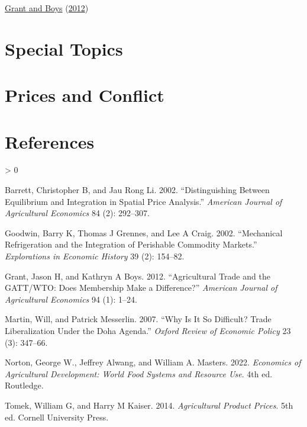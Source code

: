 \documentclass[
  oneside]{book}
\newlength{\cslhangindent}
\newenvironment{CSLReferences}[2] %
 {%
  \setlength{\parindent}{0pt}
  \ifodd #1 \everypar{\setlength{\hangindent}{\cslhangindent}}\ignorespaces\fi
  \ifnum #2 > 0
  \setlength{\parskip}{#2\baselineskip}
  \fi
 }%
 {}
\begin{document}
\protect\hyperlink{ref-grant2012}{Grant and Boys} (\protect\hyperlink{ref-grant2012}{2012})

\hypertarget{special-topics}{%
\chapter*{Special Topics}\label{special-topics}}

\hypertarget{prices-and-conflict}{%
\chapter{Prices and Conflict}\label{prices-and-conflict}}

\hypertarget{references}{%
\chapter*{References}\label{references}}

\hypertarget{refs}{}
\begin{CSLReferences}{1}{0}
\leavevmode\hypertarget{ref-barrett2002}{}%
Barrett, Christopher B, and Jau Rong Li. 2002. {``{Distinguishing Between Equilibrium and Integration in Spatial Price Analysis}.''} \emph{American Journal of Agricultural Economics} 84 (2): 292--307.

\leavevmode\hypertarget{ref-goodwin2002}{}%
Goodwin, Barry K, Thomas J Grennes, and Lee A Craig. 2002. {``{Mechanical Refrigeration and the Integration of Perishable Commodity Markets}.''} \emph{Explorations in Economic History} 39 (2): 154--82.

\leavevmode\hypertarget{ref-grant2012}{}%
Grant, Jason H, and Kathryn A Boys. 2012. {``{Agricultural Trade and the GATT/WTO: Does Membership Make a Difference?}''} \emph{American Journal of Agricultural Economics} 94 (1): 1--24.

\leavevmode\hypertarget{ref-martin2007}{}%
Martin, Will, and Patrick Messerlin. 2007. {``{Why Is It So Difficult? Trade Liberalization Under the Doha Agenda}.''} \emph{Oxford Review of Economic Policy} 23 (3): 347--66.

\leavevmode\hypertarget{ref-norton2022}{}%
Norton, George W., Jeffrey Alwang, and William A. Masters. 2022. \emph{Economics of Agricultural Development: World Food Systems and Resource Use}. 4th ed. Routledge.

\leavevmode\hypertarget{ref-tomek2014}{}%
Tomek, William G, and Harry M Kaiser. 2014. \emph{Agricultural Product Prices}. 5th ed. Cornell University Press.

\end{CSLReferences}
\end{document}
